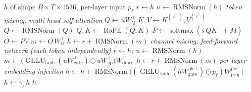 \documentclass[10pt,a4paper]{article}
\newcommand{\op}[1]{\operatorname{#1}}
\theoremstyle{definition}
\begin{document}
\begin{algorithm}[H]
\caption{Block $\mathcal{B}_{\mathrm{S2}}(h)$ --- Sliding-window attention block (KV-shared, MLP width 12288)}
\begin{algorithmic}[1]
\Require $h$ of shape $B\times T\times 1536$, per-layer input $p_\ell$
\State $r \gets h$ 
\State $u \gets \op{RMSNorm}(h)$ 
\Statex \hspace{-1.2em}\textit{token mixing: multi-head self-attention}
\State $Q \gets u W_Q^{\top}$ 
\State $K, V \gets K^{(\ell^*)}, V^{(\ell^*)}$ 
\State $Q \gets \op{RMSNorm}(Q)$ 
\State $Q, K \gets \op{RoPE}(Q, K)$ 
\State $P \gets \op{softmax}(s\, Q K^{\top} + M)$ 
\State $O \gets P V$ 
\State $m \gets O\, W_O^{\top}$ 
\State $h \gets r + \op{RMSNorm}(m)$ 
\Statex \hspace{-1.2em}\textit{channel mixing: feed-forward network (each token independently)}
\State $r \gets h;\ u \gets \op{RMSNorm}(h)$
\State $m \gets \big(\op{GELU}_{\tanh}(u W_{\mathrm{gate}}^{\top}) \odot u W_{\mathrm{up}}^{\top}\big) W_{\mathrm{down}}^{\top}$ 
\State $h \gets r + \op{RMSNorm}(m)$ 
\Statex \hspace{-1.2em}\textit{per-layer embedding injection}
\State $h \gets h + \op{RMSNorm}\big((\op{GELU}_{\tanh}(h W^{\mathrm{ple}\top}_{\mathrm{gate}}) \odot p_\ell) W^{\mathrm{ple}\top}_{\mathrm{proj}}\big)$ 
\State $h \gets \gamma_\ell\, h$ 
\State \Return $h$
\end{algorithmic}
\end{algorithm}
\end{document}
